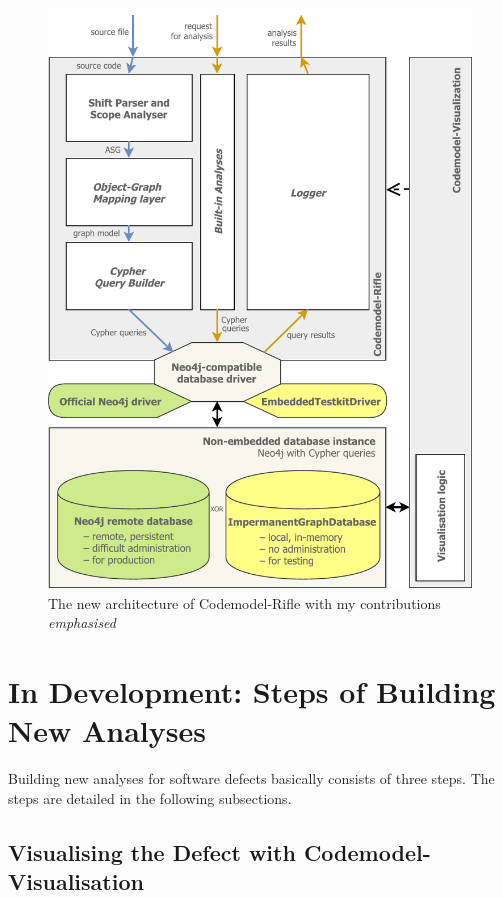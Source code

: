 \begin{figure}[!htb]
	\centering
	\includegraphics[height=\textheight-37mm,clip]{figures/codemodel-rifle-refactored-architecture.pdf}
	\caption{The new architecture of Codemodel-Rifle with my contributions \emph{emphasised}}
	\label{fig:codemodel-rifle-refactored-architecture}
\end{figure}


\newpage
\section{In Development: Steps of Building New Analyses}

Building new analyses for software defects basically consists of three steps. The steps are detailed in the following subsections.


\subsection{Visualising the Defect with Codemodel-Visualisation}

